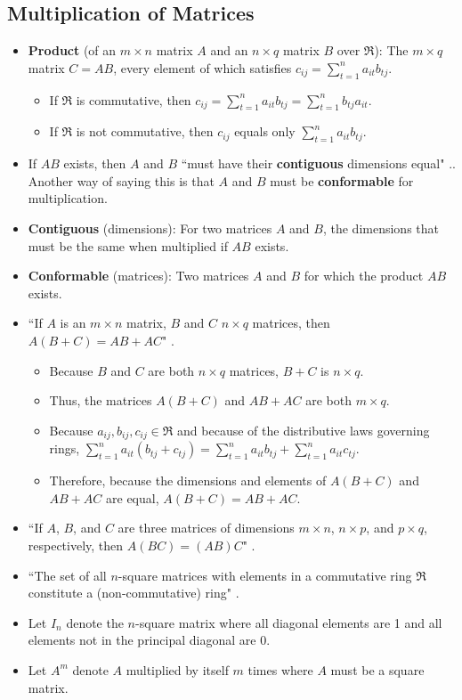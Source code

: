 \documentclass[titlepage]{article}
\numberwithin{figure}{section}
\numberwithin{equation}{section}
\numberwithin{theorem}{section}
\newcommand{\dq}[4][]{``#2"#1 \cite[#4]{#3}.}
\begin{document}
\subsection{Multiplication of Matrices}
\begin{itemize}
    \item \textbf{Product} (of an $m\times n$ matrix $A$ and an $n\times q$ matrix $B$ over $\mathfrak{R}$): The $m\times q$ matrix $C=AB$, every element of which satisfies $c_{ij}=\sum_{t=1}^n a_{it}b_{tj}$.
    \begin{itemize}
        \item If $\mathfrak{R}$ is commutative, then $c_{ij}=\sum_{t=1}^n a_{it}b_{tj}=\sum_{t=1}^n b_{tj}a_{it}$.
        \item If $\mathfrak{R}$ is not commutative, then $c_{ij}$ equals only $\sum_{t=1}^n a_{it}b_{tj}$.
    \end{itemize}
    \item If $AB$ exists, then $A$ and $B$ \dq{must have their \textbf{contiguous} dimensions equal}{bib:determinants}{6}. Another way of saying this is that $A$ and $B$ must be \textbf{conformable} for multiplication.
    \item \textbf{Contiguous} (dimensions): For two matrices $A$ and $B$, the dimensions that must be the same when multiplied if $AB$ exists.
    \item \textbf{Conformable} (matrices): Two matrices $A$ and $B$ for which the product $AB$ exists.
    \item \dq{If $A$ is an $m\times n$ matrix, $B$ and $C$ $n\times q$ matrices, then $A(B+C)=AB+AC$}{bib:determinants}{7}
    \begin{itemize}
        \item Because $B$ and $C$ are both $n\times q$ matrices, $B+C$ is $n\times q$.
        \item Thus, the matrices $A(B+C)$ and $AB+AC$ are both $m\times q$.
        \item Because $a_{ij},b_{ij},c_{ij}\in\mathfrak{R}$ and because of the distributive laws governing rings, $\sum_{t=1}^n a_{it}(b_{tj}+c_{tj}) = \sum_{t=1}^na_{it}b_{tj}+\sum_{t=1}^na_{it}c_{tj}$.
        \item Therefore, because the dimensions and elements of $A(B+C)$ and $AB+AC$ are equal, $A(B+C)=AB+AC$.
    \end{itemize}
    \item \dq{If $A$, $B$, and $C$ are three matrices of dimensions $m\times n$, $n\times p$, and $p\times q$, respectively, then $A(BC)=(AB)C$}{bib:determinants}{7}
    \item \dq{The set of all $n$-square matrices with elements in a commutative ring $\mathfrak{R}$ constitute a (non-commutative) ring}{bib:determinants}{8}
    \item Let $I_n$ denote the $n$-square matrix where all diagonal elements are 1 and all elements not in the principal diagonal are 0.
    \item Let $A^m$ denote $A$ multiplied by itself $m$ times where $A$ must be a square matrix.
\end{itemize}
\end{document}

